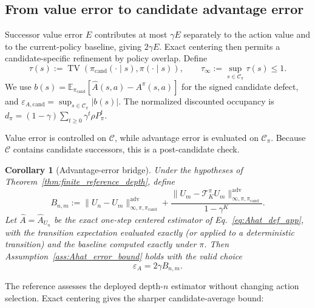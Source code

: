 \documentclass{article}
\theoremstyle{plain}
\newtheorem{corollary}[theorem]{Corollary}
\theoremstyle{definition}
\theoremstyle{remark}
\newcommand{\E}{\mathbb{E}}
\begin{document}
\subsection{From value error to candidate advantage error}

Successor value error $E$ contributes at most $\gamma E$ separately to the
action value and to the current-policy baseline, giving $2\gamma E$. Exact
centering then permits a candidate-specific refinement by policy overlap.
Define
\begin{equation}
\tau(s):=\operatorname{TV}\!\left(
\pi_{\mathrm{cand}}(\cdot\mid s),\pi(\cdot\mid s)\right),
\qquad
\tau_\infty:=\sup_{s\in\mathcal C_\pi}\tau(s)\le1.
\label{eq:policy_overlap_def}
\end{equation}
We use $b(s)=\E_{\pi_{\mathrm{cand}}}[\widehat A(s,a)-A^\pi(s,a)]$ for
the signed candidate defect, and $\varepsilon_{A,\mathrm{cand}}=
\sup_{s\in\mathcal C_\pi}|b(s)|$. The normalized discounted occupancy is
$d_\pi=(1-\gamma)\sum_{t\ge0}\gamma^t\rho P_\pi^t$.

Value error is controlled on $\mathcal C$, while advantage error is evaluated
on $\mathcal C_\pi$. Because $\mathcal C$ contains candidate successors, this
is a post-candidate check.

\begin{corollary}[Advantage-error bridge]
\label{cor:epsA_dials}
Under the hypotheses of Theorem~\ref{thm:finite_reference_depth}, define
\begin{equation}
B_{n,m}
:=
\|U_n-U_m\|_{\infty,\pi,\pi_{\mathrm{cand}}}^{\mathrm{adv}}
+
\frac{\|U_m-\mathcal T_K^\pi U_m\|_{\infty,\pi,\pi_{\mathrm{cand}}}^{\mathrm{adv}}}{1-\gamma^K}.
\label{eq:Bnm_def}
\end{equation}
Let $\widehat A=\widehat A_{U_n}$ be the exact one-step centered estimator of Eq.~\eqref{eq:Ahat_def_app}, with the transition expectation evaluated exactly (or applied to a deterministic transition) and the baseline computed exactly under $\pi$. Then Assumption~\ref{ass:Ahat_error_bound} holds with the valid choice
\begin{equation}
\varepsilon_A = 2\gamma B_{n,m}.
\label{eq:epsA_finite_reference}
\end{equation}

\end{corollary}

The reference assesses the deployed depth-$n$ estimator without changing
action selection. Exact centering gives the sharper candidate-average bound:
\end{document}

